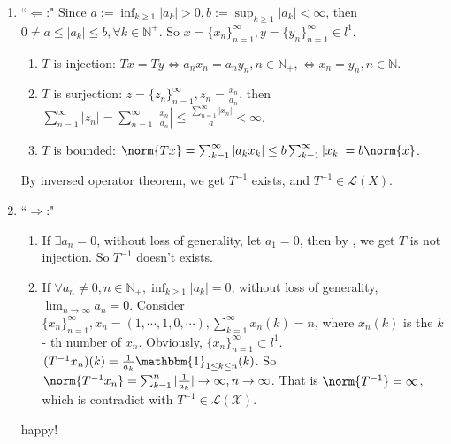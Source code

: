 \documentclass{ctexart}
\begin{document}
\begin{solution}
  \begin{enumerate}
    \item ``\(\Leftarrow\):" Since \(a:=\inf_{k \geq 1}|a_k| >0,b:= \sup_{k \geq 1} |a_k|< \infty \), 
      then \(0 \neq a \leq |a_k| \leq b, \forall k \in \mathbb{N}^+\). So \(x=\{x_n\}_{n=1}^{\infty}, y = \{y_n\}_{n=1}^{\infty} \in l^{1}\). 
      \begin{enumerate}
        \item \label{it:1} \(T\) is injection: \(T x= T y \iff a_nx_n=a_ny_n, n \in \mathbb{N}_+, \iff x_n=y_n, n \in \mathbb{N}\).
        \item \label{it:2}\(T\) is surjection: \(z = \{z_n\}_{n=1}^{\infty}, z_n=\frac{x_n}{a_n}\), then 
      \(\sum_{n=1}^{\infty} |z_n| =\sum_{n=1}^{\infty} |\frac{x_n}{a_n}|\leq \frac{\sum_{n=1}^{\infty}|x_n|}{a} < \infty \).
        \item \label{it:3} \(T\) is bounded: \(\norm{T x}=\sum_{k=1}^{\infty} |a_kx_k| \leq b \sum_{k=1}^{\infty} |x_k|=b \norm{x}\).
      \end{enumerate}
      By inversed operator theorem, we get \(T^{-1}\) exists, and \(T^{-1} \in \mathcal{L} (X)\).
    \item ``\(\Rightarrow\):"\begin{enumerate}
        \item If \(\exists a_n=0\), without loss of generality, let \(a_1=0\), then by , 
          we get \(T\) is not injection. So \(T^{-1}\) doesn't exists.
        \item If \(\forall a_n \neq 0, n \in \mathbb{N}_+, \inf_{k \geq 1}|a_k|=0  \), without loss of generality, 
          \(\lim_{n \to \infty} a_n =0\). Consider \(\{x_n\}_{n=1}^{\infty}, x_n = (1,\cdots,1,0,\cdots), \sum_{k=1}^{\infty} x_n(k) = n\), 
          where \(x_n(k)\) is the \(k\)- th number of \(x_n\). Obviously, 
          \(\{x_n\}_{n=1}^{\infty} \subset l^1\). \((T^{-1}x_n)(k) = \frac{1}{a_k} \mathbbm{1}_{1 \leq k \leq n}(k)\).
          So \(\norm{T^{-1}x_n} = \sum_{k=1}^{n} |\frac{1}{a_k}| \to \infty , n \to \infty\).
          That is \(\norm{T^{-1}} = \infty\), which is contradict with \(T^{-1} \in \mathcal{L}(\mathcal{X})\).

      \end{enumerate}

    happy!
  \end{enumerate}
\end{solution}
\end{document}
